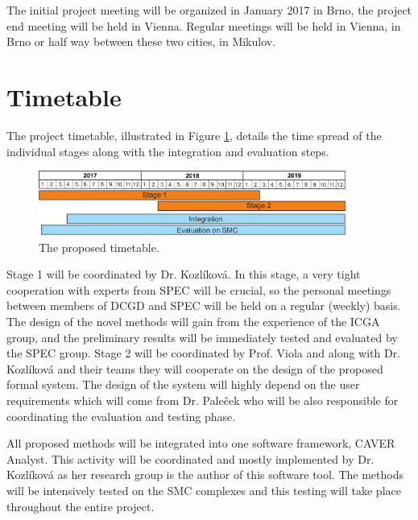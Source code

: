 \documentclass[11pt,a4paper,titlepage,oneside,onecolumn]{article}
\begin{document}
The initial project meeting will be organized in January 2017 in Brno, the project end meeting will be held in Vienna. 
Regular meetings will be held in Vienna, in Brno or half way between these two cities, in Mikulov.


\section{Timetable}
\label{sec:Timetable}
\vspace{-5mm}
The project timetable, illustrated in Figure \ref{timetable}, details the time spread of the individual stages along with the integration and evaluation steps.
 
\setlength\intextsep{0pt}
\begin{figure}[t]
\vspace{-5mm}
\centering
\includegraphics[width=0.9\textwidth]{pics/timeline.png}
\vspace{-3mm}
\caption{The proposed timetable.}
\label{timetable}
\end{figure}

Stage 1 will be coordinated by Dr. Kozl\'{i}kov\'{a}. 
In this stage, a very tight cooperation with experts from SPEC will be crucial, so the personal meetings between members of DCGD and SPEC will be held on a regular (weekly) basis. 
The design of the novel methods will gain from the experience of the ICGA group, and the preliminary results will be immediately tested and evaluated by the SPEC group. 
Stage 2 will be coordinated by Prof. Viola and along with Dr. Kozl\'{i}kov\'{a} and their teams they will cooperate on the design of the proposed formal system. 
The design of the system will highly depend on the user requirements which will come from Dr. Pale\v{c}ek who will be also responsible for coordinating the evaluation and testing phase.

All proposed methods will be integrated into one software framework, CAVER Analyst. This activity will be coordinated and mostly implemented by Dr. Kozl\'{i}kov\'{a} as her research group is the author of this software tool. The methods will be intensively tested on the SMC complexes and this testing will take place throughout the entire project.
\end{document}
